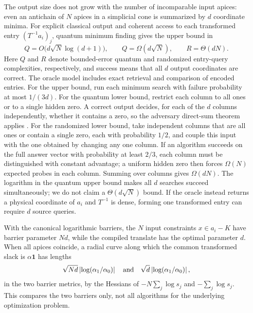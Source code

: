 The output size does not grow with the number of incomparable input
apices: even an antichain of $N$ apices in a simplicial cone is
summarized by $d$ coordinate minima. For explicit classical output and
coherent access to each transformed entry $(T^{-1}a_i)_j$, quantum
minimum finding \cite{DurrHoyer1996} gives the upper bound in
\begin{equation}\label{eq:meet-queries}
 Q=O\bigl(d\sqrt N\log(d+1)\bigr),\qquad
 Q=\Omega(d\sqrt N),\qquad R=\Theta(dN).
\end{equation}
Here $Q$ and $R$ denote bounded-error quantum and randomized entry-query
complexities, respectively, and success means that all $d$ output
coordinates are correct. The oracle model includes exact retrieval and
comparison of encoded entries. For the upper bound, run each
minimum search with failure probability at most $1/(3d)$. For the quantum
lower bound, restrict each column to all ones or to a single hidden zero.
A correct output decides, for each of the $d$ columns independently,
whether it contains a zero, so the adversary direct-sum theorem applies
\cite[Theorem~4]{ACGT2010}. For the randomized lower bound, take
independent columns that are all ones or contain a single zero, each with
probability $1/2$, and couple this input with the one obtained by
changing any one column.
If an algorithm succeeds on the full answer vector with probability at
least $2/3$, each column must be distinguished with constant advantage;
a uniform hidden zero then forces $\Omega(N)$ expected probes in each
column. Summing over columns gives $\Omega(dN)$. The logarithm in the
quantum upper bound makes all $d$ searches succeed simultaneously; we do
not claim a $\Theta(d\sqrt N)$ bound. If the oracle
instead returns a physical coordinate of $a_i$ and $T^{-1}$ is dense,
forming one transformed entry can require $d$ source queries.

With the canonical logarithmic barriers, the $N$ input constraints
$x\in a_i-K$ have barrier parameter $Nd$, while the compiled translate has
the optimal parameter $d$. When all apices coincide, a radial curve along
which the common transformed slack is $\alpha\mathbf1$ has lengths
\[
 \sqrt{Nd}\left|\log(\alpha_1/\alpha_0)\right|
 \quad\hbox{and}\quad
 \sqrt d\left|\log(\alpha_1/\alpha_0)\right|,
\]
in the two barrier metrics, by the Hessians of $-N\sum_j\log s_j$ and
$-\sum_j\log s_j$. This compares the two barriers only, not all
algorithms for the underlying optimization problem.


